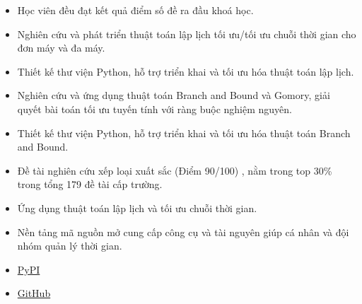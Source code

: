 \documentclass[10pt,a4paper,ragged2e,withhyper]{altacv}
\begin{document}
\begin{paracol}{2}


\begin{itemize}
\item Học viên đều đạt kết quả điểm số đề ra đầu khoá học.
\end{itemize}




\begin{itemize}
\item Nghiên cứu và phát triển thuật toán lập lịch tối ưu/tối ưu chuỗi thời gian cho đơn máy và đa máy.
\item Thiết kế thư viện Python, hỗ trợ triển khai và tối ưu hóa thuật toán lập lịch.
\end{itemize}

\divider

\begin{itemize}
\item Nghiên cứu và ứng dụng thuật toán Branch and Bound và Gomory, giải quyết bài toán tối ưu tuyến tính với ràng buộc nghiệm nguyên.
\item Thiết kế thư viện Python, hỗ trợ triển khai và tối ưu hóa thuật toán Branch and Bound.
\item Đề tài nghiên cứu xếp loại xuất sắc (Điểm 90/100) , nằm trong top 30\% trong tổng 179 đề tài cấp trường.
\end{itemize}



\begin{itemize}
\item Ứng dụng thuật toán lập lịch và tối ưu chuỗi thời gian.
\item Nền tảng mã nguồn mở cung cấp công cụ và tài nguyên giúp cá nhân và đội nhóm quản lý thời gian.
\item \href{https://pypi.org/project/TiLearn/}{PyPI} \faPython
\item \href{https://github.com/Bancie/TiLearn}{GitHub} \faGithubSquare
\end{itemize}


\end{paracol}
\end{document}
